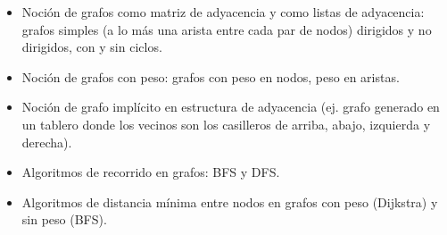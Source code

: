 \begin{itemize}
\item[\ultra] Noción de grafos como matriz de adyacencia y como listas de
  adyacencia: grafos simples (a lo más una arista entre cada par de nodos)
  dirigidos y no dirigidos, con y sin ciclos.
\item[\ultra] Noción de grafos con peso: grafos con peso en nodos, peso en aristas.
\item[\ultra] Noción de grafo implícito en estructura de adyacencia (ej.
  grafo generado en un tablero donde los vecinos son los casilleros de arriba,
  abajo, izquierda y derecha).
\item[\ultra] Algoritmos de recorrido en grafos: BFS y DFS.
\item[\ultra] Algoritmos de distancia mínima entre nodos en grafos con peso
  (Dijkstra) y sin peso (BFS).
\end{itemize}



